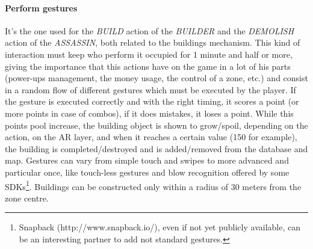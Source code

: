 				\paragraph{Perform gestures}
				It's the one used for the \emph{BUILD} action of the \emph{BUILDER} and the \emph{DEMOLISH} action of the \emph{ASSASSIN}, both related to the buildings mechanism.
				This kind of interaction must keep who perform it occupied for 1 minute and half or more, giving the importance that this actions have on the game in a lot of his parts (power-ups management, the money usage, the control of a zone, etc.) and consist in a random flow of different gestures which must be executed by the player. If the gesture is executed correctly and with the right timing, it scores a point (or more points in case of combos), if it does mistakes, it loses a point. While this points pool increase, the building object is shown to grow/spoil, depending on the action, on the AR layer, and when it reaches a certain value (150 for example), the building is completed/destroyed and is added/removed from the database and map.
				Gestures can vary from simple touch and swipes to more advanced and particular once, like touch-less gestures and blow recognition offered by some SDKs\footnote{Snapback (http://www.snapback.io/), even if not yet publicly available, can be an interesting partner to add not standard gestures.}.
				Buildings can be constructed only within a radius of 30 meters from the zone centre.